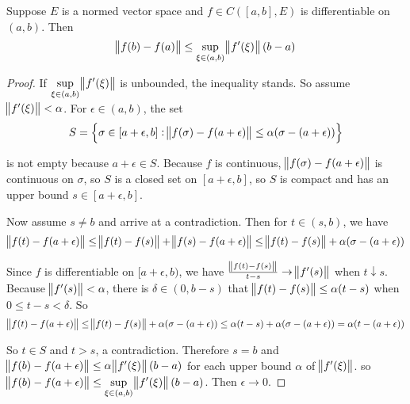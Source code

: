 \begin{theorem}\label{mean_value_theorem_for_vector_valued_function}
    Suppose $E$ is a normed vector space and $f \in C([a,b], E)$ is differentiable on $(a,b)$. Then
    \begin{equation}
        \norm{f(b) - f(a)} \leq \sup_{\xi \in (a,b)} \norm{f'(\xi)}(b-a)
    \end{equation}
\end{theorem}
\begin{proof}
    If $\displaystyle \sup_{\xi \in (a,b)} \norm{f'(\xi)}$ is unbounded, the inequality stands. So assume $\norm{f'(\xi)} < \alpha$. For $\epsilon \in (a,b)$, the set
    \begin{equation*}
        S = \set{\sigma \in [a+\epsilon, b]: \norm{f(\sigma) - f(a + \epsilon)} \leq \alpha (\sigma - (a + \epsilon))}
    \end{equation*}
    
    is not empty because $a + \epsilon \in S$. Because $f$ is continuous, $\norm{f(\sigma) - f(a + \epsilon)}$ is continuous on $\sigma$, so $S$ is a closed set on $[a+\epsilon, b]$, so $S$ is compact and has an upper bound $s \in [a+\epsilon,b]$.
    
    Now assume $s \neq b$ and arrive at a contradiction. Then for $t \in (s,b)$, we have
    \begin{equation}
        \norm{f(t) - f(a+\epsilon)} \leq \norm{f(t) - f(s)} + \norm{f(s) - f(a + \epsilon)} \leq \norm{f(t) - f(s)} + \alpha (\sigma - (a + \epsilon))
    \end{equation}
    
    Since $f$ is differentiable on $[a+\epsilon, b)$, we have $\frac{\norm{f(t) -f(s)}}{t-s} \rightarrow \norm{f'(s)}$ when $t \downarrow s$. Because $\norm{f'(s)} < \alpha$, there is $\delta \in (0, b-s)$ that $\norm{f(t) - f(s)} \leq \alpha(t-s)$ when $0 \leq t-s < \delta$. So 
    \begin{equation*}
        \norm{f(t) - f(a+\epsilon)} \leq \norm{f(t) - f(s)} + \alpha (\sigma - (a + \epsilon)) \leq \alpha(t-s) + \alpha (\sigma - (a + \epsilon)) = \alpha(t - (a + \epsilon))
    \end{equation*}
    
    So $t \in S$ and $t > s$, a contradiction. Therefore $s = b$ and $\norm{f(b) - f(a+\epsilon)} \leq \alpha \norm{f'(\xi)}(b-a)$ for each upper bound $\alpha$ of $\norm{f'(\xi)}$. so $\displaystyle \norm{f(b) - f(a+\epsilon)} \leq \sup_{\xi \in (a,b)} \norm{f'(\xi)}(b-a)$. Then $\epsilon \rightarrow 0$.
\end{proof}

